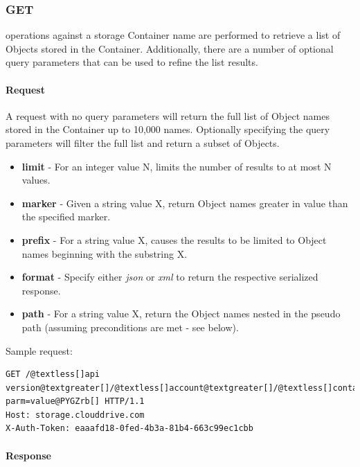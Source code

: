 \documentclass[letterpaper,10pt,english]{manual}
\begin{document}
\subsubsection{GET}

 operations against a storage Container name are performed to
retrieve a list of Objects stored in the Container. Additionally, there
are a number of optional query parameters that can be used to refine the
list results.


\paragraph{Request}

A request with no query parameters will return the full list of Object
names stored in the Container up to 10,000 names.  Optionally specifying
the query parameters will filter the full list and return a subset of
Objects.
\begin{itemize}
\item {} 
\textbf{limit} - For an integer value N, limits the number of results to at
most N values.

\item {} 
\textbf{marker} - Given a string value X, return Object names greater in
value than the specified marker.

\item {} 
\textbf{prefix} - For a string value X, causes the results to be limited
to Object names beginning with the substring X.

\item {} 
\textbf{format} - Specify either \emph{json} or \emph{xml} to return the respective
serialized response.

\item {} 
\textbf{path} - For a string value X, return the Object names nested in the
pseudo path (assuming preconditions are met - see below).

\end{itemize}

Sample request:

\begin{Verbatim}[commandchars=@\[\]]
GET /@textless[]api version@textgreater[]/@textless[]account@textgreater[]/@textless[]container@textgreater[]@PYGZlb[]?parm=value@PYGZrb[] HTTP/1.1
Host: storage.clouddrive.com
X-Auth-Token: eaaafd18-0fed-4b3a-81b4-663c99ec1cbb
\end{Verbatim}


\paragraph{Response}
\end{document}
